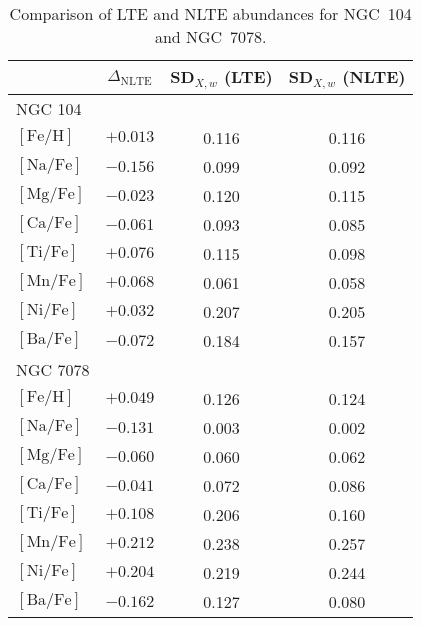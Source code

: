 \documentclass{aa}
\begin{document}
\begin{table}
\caption{Comparison of LTE and NLTE abundances for NGC~104 and NGC~7078.}
\label{tab:ltevsnlte}
\centering
\begin{tabular}{lccc}
\hline\hline
         & $\Delta_\mathrm{NLTE}$ & SD$_{X,w}$ (LTE) & SD$_{X,w}$ (NLTE) \\ \hline
NGC 104 \\
  $\mathrm{[Fe/H]}$  & $+0.013$ & 0.116 & 0.116 \\
  $\mathrm{[Na/Fe]}$ & $-0.156$ & 0.099 & 0.092 \\
  $\mathrm{[Mg/Fe]}$ & $-0.023$ & 0.120 & 0.115 \\
  $\mathrm{[Ca/Fe]}$ & $-0.061$ & 0.093 & 0.085 \\
  $\mathrm{[Ti/Fe]}$ & $+0.076$ & 0.115 & 0.098 \\
  $\mathrm{[Mn/Fe]}$ & $+0.068$ & 0.061 & 0.058 \\
  $\mathrm{[Ni/Fe]}$ & $+0.032$ & 0.207 & 0.205 \\
  $\mathrm{[Ba/Fe]}$ & $-0.072$ & 0.184 & 0.157 \\
NGC 7078 \\
  $\mathrm{[Fe/H]}$  & $+0.049$ & 0.126 & 0.124 \\
  $\mathrm{[Na/Fe]}$ & $-0.131$ & 0.003 & 0.002 \\
  $\mathrm{[Mg/Fe]}$ & $-0.060$ & 0.060 & 0.062 \\
  $\mathrm{[Ca/Fe]}$ & $-0.041$ & 0.072 & 0.086 \\
  $\mathrm{[Ti/Fe]}$ & $+0.108$ & 0.206 & 0.160 \\
  $\mathrm{[Mn/Fe]}$ & $+0.212$ & 0.238 & 0.257 \\
  $\mathrm{[Ni/Fe]}$ & $+0.204$ & 0.219 & 0.244 \\
  $\mathrm{[Ba/Fe]}$ & $-0.162$ & 0.127 & 0.080 \\ \hline
\end{tabular}

\end{table}
\end{document}
